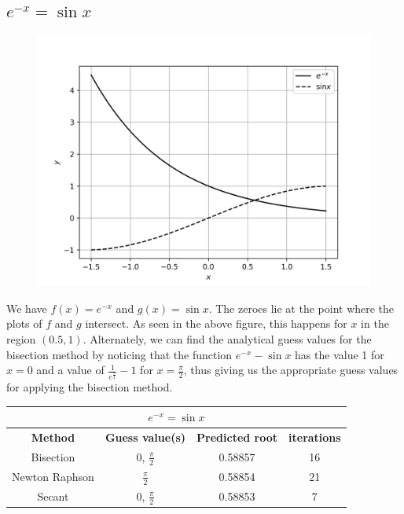 \documentclass[12,a4paper]{article}
\begin{document}
    \subsection{$e^{-x} = \sin x$}
    \begin{figure}[H]
        \centering
        \includegraphics[width = \textwidth]{plots/p6.png}
        \label{fig:my_label}
    \end{figure}
    We have $f(x) = e^{-x}$ and $g(x) = \sin x$. The zeroes lie at the point where the plots of $f$ and $g$ intersect. As seen in the above figure, this happens for $x$ in the region $(0.5,1)$. Alternately, we can find the analytical guess values for the bisection method by noticing that the function $e^{-x} - \sin x$ has the value 1 for $x = 0$ and a value of $\frac{1}{e^{\frac{\pi}{2}}} - 1$ for $x = \frac{\pi}{2}$, thus giving us the appropriate guess values for applying the bisection method.
    \begin{table}[h!]
        \centering
        \begin{tabular}{|c|c c c|} 
            \hline
            \multicolumn{4}{|c|}{$e^{-x} = \sin x$}\\
            \hline
            \textbf{Method}&\textbf{Guess value(s)}&\textbf{Predicted root}&\textbf{iterations} \\ [0.5ex] 
            \hline
            Bisection & 0, $\frac{\pi}{2}$ & 0.58857 & 16 \\ 
            Newton Raphson & $\frac{\pi}{2}$ & 0.58854 & 21 \\
            Secant &  0, $\frac{\pi}{2}$ & 0.58853 & 7  \\[1ex] 
            \hline
        \end{tabular}
    \end{table}
\end{document}
